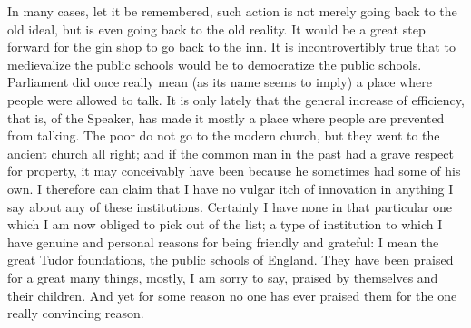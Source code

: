 \documentclass{book}
\begin{document}
In many cases, let it be remembered, such action is not merely going back to the old ideal, but is even going back to the old reality. It would be a great step forward for the gin shop to go back to the inn. It is incontrovertibly true that to medievalize the public schools would be to democratize the public schools. Parliament did once really mean (as its name seems to imply) a place where people were allowed to talk. It is only lately that the general increase of efficiency, that is, of the Speaker, has made it mostly a place where people are prevented from talking. The poor do not go to the modern church, but they went to the ancient church all right; and if the common man in the past had a grave respect for property, it may conceivably have been because he sometimes had some of his own. I therefore can claim that I have no vulgar itch of innovation in anything I say about any of these institutions. Certainly I have none in that particular one which I am now obliged to pick out of the list; a type of institution to which I have genuine and personal reasons for being friendly and grateful: I mean the great Tudor foundations, the public schools of England. They have been praised for a great many things, mostly, I am sorry to say, praised by themselves and their children. And yet for some reason no one has ever praised them for the one really convincing reason.
\end{document}
